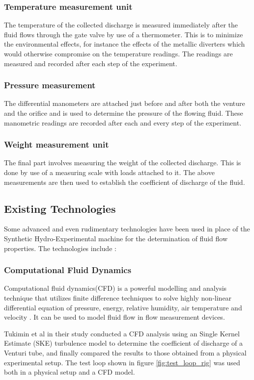 \subsubsection{Temperature measurement unit }
\par
 The temperature of the collected discharge is measured immediately after the fluid flows through the gate valve by use of a thermometer. This is to minimize the environmental effects, for instance the effects of the metallic diverters which would otherwise compromise on the temperature readings. The readings are measured and recorded after each step of the experiment.
\subsubsection{Pressure measurement }
\par
The differential manometers are attached just before and after both the venture and the orifice and is used to determine the pressure of the flowing fluid. These manometric readings are recorded after each and every step of the experiment.
\subsubsection{Weight measurement unit }
\par
The final part involves measuring the weight of the collected discharge. This is done by use of a measuring scale with loads attached to it. The above measurements are then used to establish the coefficient of discharge of the fluid.
\subsection{Existing Technologies}
Some advanced and even rudimentary technologies have been used in place of the Synthetic Hydro-Experimental machine for the determination of fluid flow properties. The technologies include :   
\subsubsection{Computational Fluid Dynamics}
Computational fluid dynamics(CFD) is a powerful modelling and analysis technique that utilizes finite difference techniques to solve highly non-linear differential equation of pressure, energy, relative humidity, air temperature and velocity \cite{raman2018review}. It can be used to model fluid flow in flow measurement devices.
\par
Tukimin et al \cite{tukimin2016cfd} in their study  conducted a CFD analysis using an Single Kernel Estimate (SKE) turbulence model to determine the coefficient of discharge of a Venturi tube, and finally compared the results to those obtained from a physical experimental setup. The test loop shown in figure \ref{fig:test_loop_rig} was used both in a physical setup and a CFD model. 

